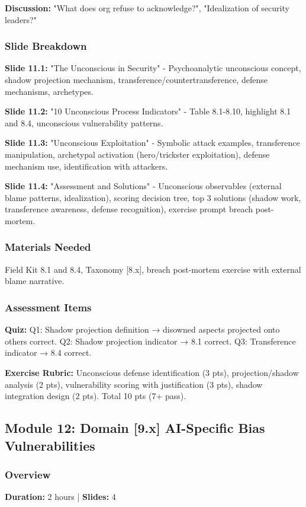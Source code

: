 \documentclass[11pt,a4paper]{article}
\begin{document}
\textbf{Discussion:} "What does org refuse to acknowledge?", "Idealization of security leaders?"

\subsubsection{Slide Breakdown}
\textbf{Slide 11.1:} "The Unconscious in Security" - Psychoanalytic unconscious concept, shadow projection mechanism, transference/countertransference, defense mechanisms, archetypes.

\textbf{Slide 11.2:} "10 Unconscious Process Indicators" - Table 8.1-8.10, highlight 8.1 and 8.4, unconscious vulnerability patterns.

\textbf{Slide 11.3:} "Unconscious Exploitation" - Symbolic attack examples, transference manipulation, archetypal activation (hero/trickster exploitation), defense mechanism use, identification with attackers.

\textbf{Slide 11.4:} "Assessment and Solutions" - Unconscious observables (external blame patterns, idealization), scoring decision tree, top 3 solutions (shadow work, transference awareness, defense recognition), exercise prompt breach post-mortem.

\subsubsection{Materials Needed}
Field Kit 8.1 and 8.4, Taxonomy [8.x], breach post-mortem exercise with external blame narrative.

\subsubsection{Assessment Items}
\textbf{Quiz:} Q1: Shadow projection definition → disowned aspects projected onto others correct. Q2: Shadow projection indicator → 8.1 correct. Q3: Transference indicator → 8.4 correct.

\textbf{Exercise Rubric:} Unconscious defense identification (3 pts), projection/shadow analysis (2 pts), vulnerability scoring with justification (3 pts), shadow integration design (2 pts). Total 10 pts (7+ pass).

\subsection{Module 12: Domain [9.x] AI-Specific Bias Vulnerabilities}

\subsubsection{Overview}
\textbf{Duration:} 2 hours | \textbf{Slides:} 4
\end{document}
